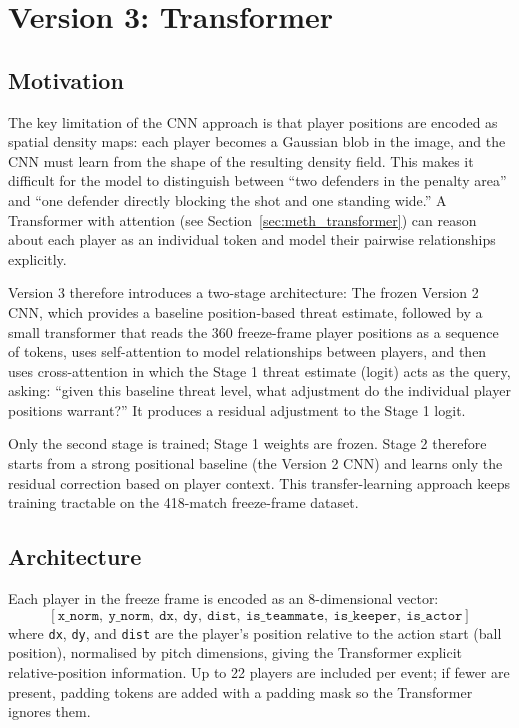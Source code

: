 \chapter{Version 3: Transformer}\label{ch:v3}

\section{Motivation}

The key limitation of the CNN approach is that player positions are encoded as spatial density maps: each player becomes a Gaussian blob in the image, and the CNN must learn from the shape of the resulting density field. This makes it difficult for the model to distinguish between ``two defenders in the penalty area'' and ``one defender directly blocking the shot and one standing wide.'' A Transformer with attention (see Section~\ref{sec:meth_transformer}) can reason about each player as an individual token and model their pairwise relationships explicitly.

Version 3 therefore introduces a two-stage architecture:
The frozen Version 2 CNN, which provides a baseline position-based threat estimate, followed by a small transformer that reads the 360 freeze-frame player positions as a sequence of tokens, uses self-attention to model relationships between players, and then uses cross-attention in which the Stage 1 threat estimate (logit) acts as the query, asking: ``given this baseline threat level, what adjustment do the individual player positions warrant?'' It produces a residual adjustment to the Stage 1 logit.


Only the second stage is trained; Stage 1 weights are frozen. Stage 2 therefore starts from a strong positional baseline (the Version 2 CNN) and learns only the residual correction based on player context. This transfer-learning approach \cite{devlin2019} keeps training tractable on the 418-match freeze-frame dataset.


\section{Architecture}

Each player in the freeze frame is encoded as an 8-dimensional vector:
\[
[\texttt{x\_norm},\ \texttt{y\_norm},\ \texttt{dx},\ \texttt{dy},\ \texttt{dist},\ \texttt{is\_teammate},\ \texttt{is\_keeper},\ \texttt{is\_actor}]
\]
where \texttt{dx}, \texttt{dy}, and \texttt{dist} are the player's position relative to the action start (ball position), normalised by pitch dimensions, giving the Transformer explicit relative-position information. Up to 22 players are included per event; if fewer are present, padding tokens are added with a padding mask so the Transformer ignores them.

